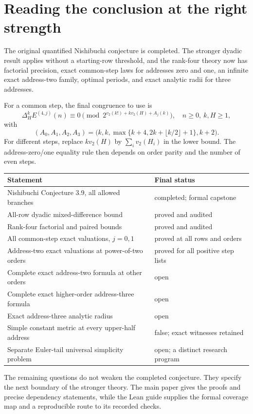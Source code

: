 \clearpage
\section{Reading the conclusion at the right strength}

The original quantified Nishibuchi conjecture is completed. The stronger
dyadic result applies without a starting-row threshold, and the rank-four
theory now has factorial precision, exact common-step laws for addresses zero
and one, an infinite exact address-two family, optimal periods, and exact
analytic radii for three addresses.

For a common step, the final congruence to use is
\[
 \Delta_H^k E^{(4,j)}(n)
 \equiv0\pmod {2^{v_2(k!)+k v_2(H)+A_j(k)}},
 \quad n\ge0,\ k,H\ge1,
\]
with
\[
 (A_0,A_1,A_2,A_3)
 =\bigl(k,k,\max\{k+4,2k+\lfloor k/2\rfloor+1\},k+2\bigr).
\]
For different steps, replace $k v_2(H)$ by $\sum_i v_2(H_i)$ in the lower
bound. The address-zero/one equality rule then depends on order parity and the
number of even steps.

\begin{center}
\begin{tabular}{p{.55\linewidth}p{.35\linewidth}}
\toprule
Statement & Final status \\
\midrule
Nishibuchi Conjecture 3.9, all allowed branches & completed; formal capstone \\
All-row dyadic mixed-difference bound & proved and audited \\
Rank-four factorial and paired bounds & proved and audited \\
All common-step exact valuations, $j=0,1$ & proved at all rows and orders \\
Address-two exact valuations at power-of-two orders & proved for all positive step lists \\
Complete exact address-two formula at other orders & open \\
Complete exact higher-order address-three formula & open \\
Exact address-three analytic radius & open \\
Simple constant metric at every upper-half address & false; exact witnesses retained \\
Separate Euler-tail universal simplicity problem & open; a distinct research program \\
\bottomrule
\end{tabular}
\end{center}

The remaining questions do not weaken the completed conjecture. They specify
the next boundary of the stronger theory. The main paper gives the proofs and
precise dependency statements, while the Lean guide supplies the formal
coverage map and a reproducible route to its recorded checks.
